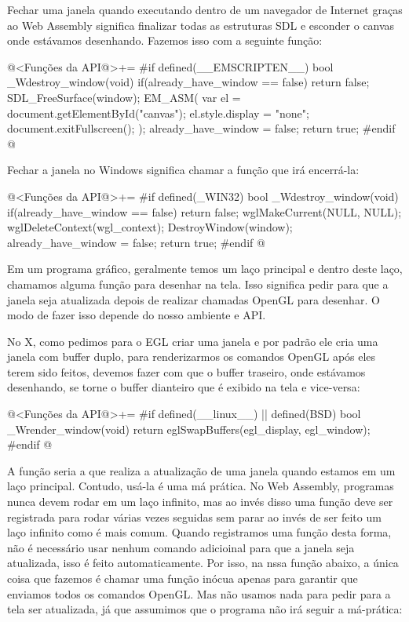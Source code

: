 Fechar uma janela quando executando dentro de um navegador de Internet
graças ao Web Assembly significa finalizar todas as estruturas SDL e
esconder o canvas onde estávamos desenhando. Fazemos isso com a
seguinte função:

\iniciocodigo
@<Funções da API@>+=
#if defined(__EMSCRIPTEN__)
bool _Wdestroy_window(void){
  if(already_have_window == false)
    return false;
  SDL_FreeSurface(window);
  EM_ASM(
    var el = document.getElementById("canvas");
    el.style.display = "none";
    document.exitFullscreen();
  );
  already_have_window = false;
  return true;
}
#endif
@
\fimcodigo


Fechar a janela no Windows significa chamar a  função que irá
encerrá-la:

\iniciocodigo
@<Funções da API@>+=
#if defined(_WIN32)
bool _Wdestroy_window(void){
  if(already_have_window == false)
    return false;
  wglMakeCurrent(NULL, NULL);
  wglDeleteContext(wgl_context);
  DestroyWindow(window);
  already_have_window = false;
  return true;
}
#endif
@
\fimcodigo


Em um programa gráfico, geralmente temos um laço principal e dentro
deste laço, chamamos alguma função para desenhar na tela. Isso
significa pedir para que a janela seja atualizada depois de realizar
chamadas OpenGL para desenhar. O modo de fazer isso depende do nosso
ambiente e API.


No X, como pedimos para o EGL criar uma janela e por padrão ele cria
uma janela com buffer duplo, para renderizarmos os comandos OpenGL
após eles terem sido feitos, devemos fazer com que o buffer traseiro,
onde estávamos desenhando, se torne o buffer dianteiro que é exibido
na tela e vice-versa:

\iniciocodigo
@<Funções da API@>+=
#if defined(__linux__) || defined(BSD)
bool _Wrender_window(void){
  return eglSwapBuffers(egl_display, egl_window);
}
#endif
@
\fimcodigo


A função  seria a que realiza a
atualização de uma janela quando estamos em um laço
principal. Contudo, usá-la é uma má prática. No Web Assembly,
programas nunca devem rodar em um laço infinito, mas ao invés disso
uma função deve ser registrada para rodar várias vezes seguidas sem
parar ao invés de ser feito um laço infinito como é mais comum. Quando
registramos uma função desta forma, não é necessário usar nenhum
comando adicioinal para que a janela seja atualizada, isso é feito
automaticamente. Por isso, na nssa função abaixo, a única coisa que
fazemos é chamar uma função inócua apenas para garantir que enviamos
todos os comandos OpenGL. Mas não usamos nada para pedir para a tela
ser atualizada, já que assumimos que o programa não irá seguir a
má-prática:

